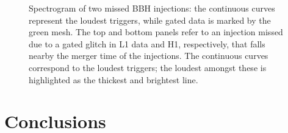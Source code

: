 \documentclass[binding=0.6cm, LaM]{sapthesis}
\begin{document}
        \begin{figure}[!t]
          \noindent
          \label{gated}
          \centering
          \caption{Spectrogram of two missed BBH injections: the continuous curves represent the loudest triggers, while gated data is marked by the green mesh.  The top and bottom panels refer to an injection missed due to a gated glitch in L1 data and H1, respectively, that falls nearby the merger time of the injections. The continuous curves correspond to the loudest triggers; the loudest amongst these is highlighted as the thickest and brightest line.}
          \label{fig:gated}
        \end{figure}

\chapter*{Conclusions}
\end{document}
